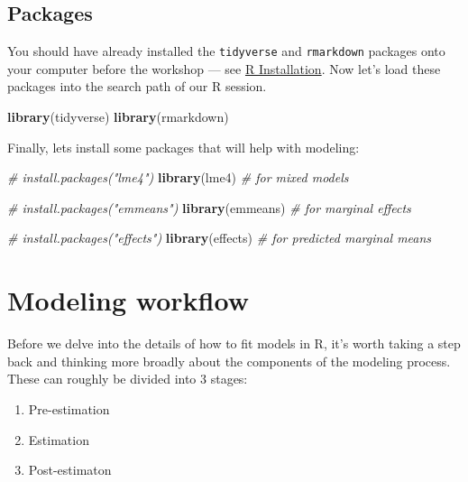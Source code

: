 \documentclass[
]{book}
\newenvironment{Shaded}{\begin{snugshade}}{\end{snugshade}}
\newcommand{\CommentTok}[1]{\textcolor[rgb]{0.56,0.35,0.01}{\textit{#1}}}
\newcommand{\KeywordTok}[1]{\textcolor[rgb]{0.13,0.29,0.53}{\textbf{#1}}}
\newcommand{\NormalTok}[1]{#1}
\providecommand{\tightlist}{%
  \setlength{\itemsep}{0pt}\setlength{\parskip}{0pt}}
\begin{document}
\hypertarget{packages}{%
\subsection{Packages}\label{packages}}

You should have already installed the \texttt{tidyverse} and \texttt{rmarkdown} packages onto your computer before the workshop --- see \href{./Rinstall.html}{R Installation}. Now let's load these packages into the search path of our R session.

\begin{Shaded}
\begin{Highlighting}[]
\KeywordTok{library}\NormalTok{(tidyverse)}
\KeywordTok{library}\NormalTok{(rmarkdown)}
\end{Highlighting}
\end{Shaded}

Finally, lets install some packages that will help with modeling:

\begin{Shaded}
\begin{Highlighting}[]
\CommentTok{\# install.packages("lme4")}
\KeywordTok{library}\NormalTok{(lme4)  }\CommentTok{\# for mixed models}

\CommentTok{\# install.packages("emmeans")}
\KeywordTok{library}\NormalTok{(emmeans)  }\CommentTok{\# for marginal effects}

\CommentTok{\# install.packages("effects")}
\KeywordTok{library}\NormalTok{(effects)  }\CommentTok{\# for predicted marginal means}
\end{Highlighting}
\end{Shaded}

\hypertarget{modeling-workflow}{%
\section{Modeling workflow}\label{modeling-workflow}}

Before we delve into the details of how to fit models in R, it's worth taking a step back and thinking more broadly about the components of the modeling process. These can roughly be divided into 3 stages:

\begin{enumerate}
\def\labelenumi{\arabic{enumi}.}
\tightlist
\item
  Pre-estimation
\item
  Estimation
\item
  Post-estimaton
\end{enumerate}
\end{document}
